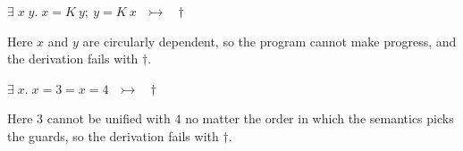 \documentclass[runningheads]{llncs}
\begin{document}
\begin{example}
    $\exists\; x\;y.\; x=K~y;~y = K~x~~~\rightarrowtail~~~\dagger$ 
\end{example}

Here $x$ and $y$ are circularly dependent, so the program cannot make progress,
and the derivation fails with $\dagger$. 

\begin{example}
    $\exists\; x.\;x=3=x=4~~~\rightarrowtail~~~\dagger$ 
\end{example}

Here $3$ cannot be unified with $4$ no matter the order in which 
the semantics picks the guards, so the derivation fails with $\dagger$. 






  


\end{document}
